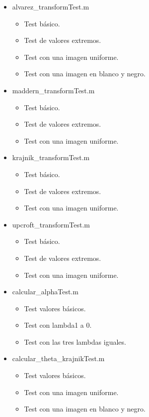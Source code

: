 \begin{itemize}
    \item alvarez\_transformTest.m
    \begin{itemize}
        \item Test básico.
        \item Test de valores extremos.
        \item Test con una imagen uniforme.
        \item Test con una imagen en blanco y negro.
    \end{itemize}
    \item maddern\_transformTest.m
    \begin{itemize}
        \item Test básico.
        \item Test de valores extremos.
        \item Test con una imagen uniforme.
    \end{itemize}
    \item krajnik\_transformTest.m
    \begin{itemize}
        \item Test básico.
        \item Test de valores extremos.
        \item Test con una imagen uniforme.
    \end{itemize}
    \item upcroft\_transformTest.m
    \begin{itemize}
        \item Test básico.
        \item Test de valores extremos.
        \item Test con una imagen uniforme.
    \end{itemize}
    \item calcular\_alphaTest.m
    \begin{itemize}
        \item Test valores básicos.
        \item Test con lambda1 a 0.
        \item Test con las tres lambdas iguales.
    \end{itemize}
    \item calcular\_theta\_krajnikTest.m
    \begin{itemize}
        \item Test valores básicos.
        \item Test con una imagen uniforme.
        \item Test con una imagen en blanco y negro.

\end{itemize}
\end{itemize}
